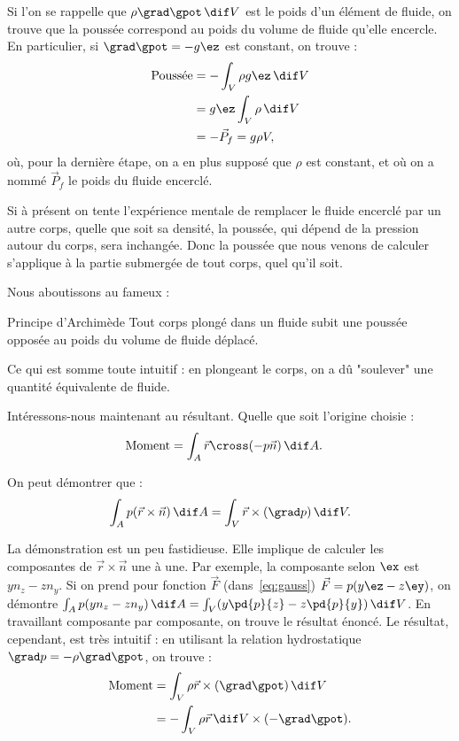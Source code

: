 Si l'on se rappelle que $\rho \grad \gpot\, \dif V$ est le poids d'un élément de fluide, on trouve que la poussée correspond au poids du volume de fluide qu'elle encercle. En particulier, si $\grad \gpot = -g \ez$ est constant, on trouve :
\begin{displaymath}
  \begin{split}
    \text{Poussée} &= - \int_V \rho g \ez\, \dif V  \\
                    &= g \ez \int_V \rho \, \dif V  \\
                    &= - \vec{P}_f = g \rho V,
  \end{split}
\end{displaymath}
où, pour la dernière étape, on a en plus supposé que $\rho$ est constant, et où on a nommé $\vec{P}_f$ le poids du fluide encerclé.

Si à présent on tente l'expérience mentale de remplacer le fluide encerclé par un autre corps, quelle que soit sa densité, la poussée, qui dépend de la pression autour du corps, sera inchangée. Donc la poussée que nous venons de calculer s'applique à la partie submergée de tout corps, quel qu'il soit.

Nous aboutissons au fameux :
\begin{key}{Principe d'Archimède}
Tout corps plongé dans un fluide subit une poussée opposée au poids du volume de fluide déplacé.
\end{key}

Ce qui est somme toute intuitif : en plongeant le corps, on a dû "soulever" une quantité équivalente de fluide.

Intéressons-nous maintenant au  résultant. Quelle que soit l'origine choisie :
\begin{displaymath}
  \begin{split}
    \text{Moment} &= \int_A \vec{r} \cross (-p \vec{n})\, \dif A.
  \end{split}
\end{displaymath}

On peut démontrer que :
\begin{displaymath}
  \int_A p (\vec{r} \times \vec{n})\, \dif A = \int_V \vec{r} \times (\grad p)\, \dif V.
\end{displaymath}

La démonstration est un peu fastidieuse. Elle implique de calculer les composantes de $\vec{r} \times \vec{n}$ une à une. Par exemple, la composante selon $\ex$ est $yn_z - zn_y$. Si on prend pour fonction $\vec{F}$ (dans~\eqref{eq:gauss}) $\vec{F} = p(y\ez - z\ey)$, on démontre $\int_A p(yn_z - zn_y)\,\dif A = \int_V (y \pd{p}{z} - z \pd{p}{y})\, \dif V$. En travaillant composante par composante, on trouve le résultat énoncé. Le résultat, cependant,  est très intuitif : en utilisant la relation hydrostatique $\grad p = -\rho \grad \gpot$, on trouve :
\begin{displaymath}
  \begin{split}
    \text{Moment} &= \int_V \rho \vec{r} \times (\grad \gpot)\, \dif V \\
                   &= - \int_V \rho \vec{r}\, \dif V \times (-\grad \gpot).
  \end{split}
\end{displaymath}

